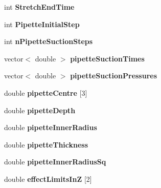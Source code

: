 \begin{DoxyCompactItemize}
\item 
\hypertarget{classSimulation_af13e08bc4489985bbb66400226595aac}{}int {\bfseries Stretch\+End\+Time}\label{classSimulation_af13e08bc4489985bbb66400226595aac}

\item 
\hypertarget{classSimulation_ab3f29a12d0630213fe58e14a0e198ca0}{}int {\bfseries Pipette\+Initial\+Step}\label{classSimulation_ab3f29a12d0630213fe58e14a0e198ca0}

\item 
\hypertarget{classSimulation_a54a1f04e643d462d60644fef64fd7416}{}int {\bfseries n\+Pipette\+Suction\+Steps}\label{classSimulation_a54a1f04e643d462d60644fef64fd7416}

\item 
\hypertarget{classSimulation_a4bf506866f84db0b0e68147067c21545}{}vector$<$ double $>$ {\bfseries pipette\+Suction\+Times}\label{classSimulation_a4bf506866f84db0b0e68147067c21545}

\item 
\hypertarget{classSimulation_af4ae02264340b226a8ed9b4ff86092f2}{}vector$<$ double $>$ {\bfseries pipette\+Suction\+Pressures}\label{classSimulation_af4ae02264340b226a8ed9b4ff86092f2}

\item 
\hypertarget{classSimulation_a80ba175cfd0377ddab49a0058139f03c}{}double {\bfseries pipette\+Centre} \mbox{[}3\mbox{]}\label{classSimulation_a80ba175cfd0377ddab49a0058139f03c}

\item 
\hypertarget{classSimulation_a6d987f6569d306688d272436294e85f4}{}double {\bfseries pipette\+Depth}\label{classSimulation_a6d987f6569d306688d272436294e85f4}

\item 
\hypertarget{classSimulation_a9c0a8edcc987294ad36dc43cb0b2c77c}{}double {\bfseries pipette\+Inner\+Radius}\label{classSimulation_a9c0a8edcc987294ad36dc43cb0b2c77c}

\item 
\hypertarget{classSimulation_a330bde4b57359e57318c1105edde06c5}{}double {\bfseries pipette\+Thickness}\label{classSimulation_a330bde4b57359e57318c1105edde06c5}

\item 
\hypertarget{classSimulation_ab7a32b7ebb6db0157237249733ee653f}{}double {\bfseries pipette\+Inner\+Radius\+Sq}\label{classSimulation_ab7a32b7ebb6db0157237249733ee653f}

\item 
\hypertarget{classSimulation_a70a94dce9bdc0a99a99cab0abe805185}{}double {\bfseries effect\+Limits\+In\+Z} \mbox{[}2\mbox{]}\label{classSimulation_a70a94dce9bdc0a99a99cab0abe805185}


\end{DoxyCompactItemize}
